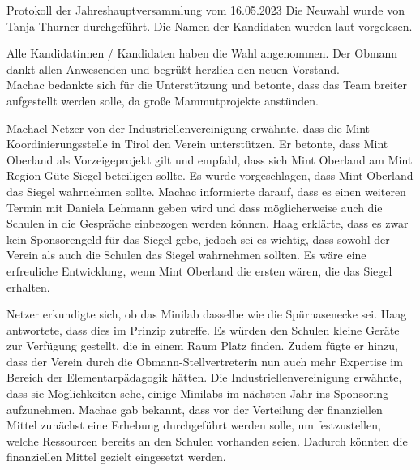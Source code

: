 \documentclass{scrartcl}
\newcommand\obmann{Philipp Machac}
\begin{document}
\begin{Minutes}{Protokoll der Jahreshauptversammlung vom 16.05.2023}
  \noindent  Die Neuwahl wurde von Tanja Thurner durchgeführt. Die Namen der Kandidaten wurden laut vorgelesen.\\
 \leavevmode\newline
 
 \noindent Alle Kandidatinnen / Kandidaten haben die Wahl angenommen.
  Der Obmann dankt allen Anwesenden und begrüßt herzlich den neuen Vorstand.\\

  Machac bedankte sich für die Unterstützung und betonte, dass das Team breiter aufgestellt werden solle, da große Mammutprojekte anstünden.

  Machael Netzer von der Industriellenvereinigung erwähnte, dass die Mint Koordinierungsstelle in Tirol den Verein unterstützen. Er betonte, dass Mint Oberland als Vorzeigeprojekt gilt und empfahl, dass sich Mint Oberland am Mint Region Güte Siegel beteiligen sollte. Es wurde vorgeschlagen, dass Mint Oberland das Siegel wahrnehmen sollte.
  Machac informierte darauf, dass es einen weiteren Termin mit Daniela Lehmann geben wird und dass möglicherweise auch die Schulen in die Gespräche einbezogen werden können.
  Haag erklärte, dass es zwar kein Sponsorengeld für das Siegel gebe, jedoch sei es wichtig, dass sowohl der Verein als auch die Schulen das Siegel wahrnehmen sollten. Es wäre eine erfreuliche Entwicklung, wenn Mint Oberland die ersten wären, die das Siegel erhalten.
  
  Netzer erkundigte sich, ob das Minilab dasselbe wie die Spürnasenecke sei.
  Haag antwortete, dass dies im Prinzip zutreffe. Es würden den Schulen kleine Geräte zur Verfügung gestellt, die in einem Raum Platz finden. Zudem fügte er hinzu, dass der Verein durch die Obmann-Stellvertreterin nun auch mehr Expertise im Bereich der Elementarpädagogik hätten.
  Die Industriellenvereinigung erwähnte, dass sie Möglichkeiten sehe, einige Minilabs im nächsten Jahr ins Sponsoring aufzunehmen.
  Machac gab bekannt, dass vor der Verteilung der finanziellen Mittel zunächst eine Erhebung durchgeführt werden solle, um festzustellen, welche Ressourcen bereits an den Schulen vorhanden seien. Dadurch könnten die finanziellen Mittel gezielt eingesetzt werden.

  \vspace{0.2\textheight}

  \signature{Obmann, \obmann}
  \hspace{0.2\columnwidth}
  \signature{Schriftführer, Simon Abler}
\end{Minutes}

\end{document}
